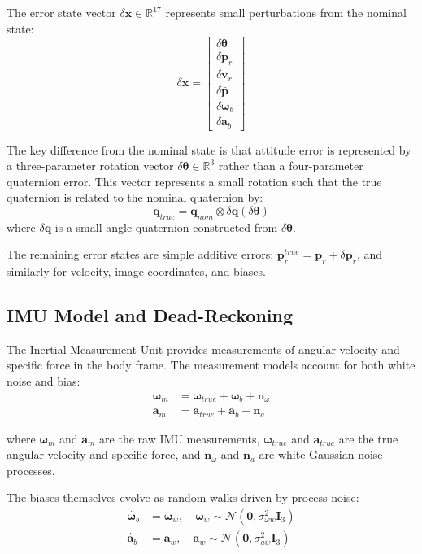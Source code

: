 \documentclass[11pt,a4paper]{article}
\newcommand{\quat}{\mathbf{q}}
\newcommand{\pr}{\mathbf{p}_r}
\newcommand{\vr}{\mathbf{v}_r}
\newcommand{\pbar}{\bar{\mathbf{p}}}
\newcommand{\bgyr}{\bm{\omega}_b}
\newcommand{\bacc}{\mathbf{a}_b}
\newcommand{\I}{\mathbf{I}}
\begin{document}
The error state vector $\delta\mathbf{x} \in \mathbb{R}^{17}$ represents small perturbations from the nominal state:
\begin{equation}
    \delta\mathbf{x} = \begin{bmatrix} \delta\bm{\theta} \\ \delta\pr \\ \delta\vr \\ \delta\pbar \\ \delta\bgyr \\ \delta\bacc \end{bmatrix}
\end{equation}

The key difference from the nominal state is that attitude error is represented by a three-parameter rotation vector $\delta\bm{\theta} \in \mathbb{R}^3$ rather than a four-parameter quaternion error. This vector represents a small rotation such that the true quaternion is related to the nominal quaternion by:
\begin{equation}
    \quat_{true} = \quat_{nom} \otimes \delta\quat(\delta\bm{\theta})
\end{equation}
where $\delta\quat$ is a small-angle quaternion constructed from $\delta\bm{\theta}$.

The remaining error states are simple additive errors: $\pr^{true} = \pr + \delta\pr$, and similarly for velocity, image coordinates, and biases.

\subsection{IMU Model and Dead-Reckoning}

The Inertial Measurement Unit provides measurements of angular velocity and specific force in the body frame. The measurement models account for both white noise and bias:
\begin{align}
    \bm{\omega}_m &= \bm{\omega}_{true} + \bgyr + \mathbf{n}_\omega \\
    \mathbf{a}_m &= \mathbf{a}_{true} + \bacc + \mathbf{n}_a
\end{align}

where $\bm{\omega}_m$ and $\mathbf{a}_m$ are the raw IMU measurements, $\bm{\omega}_{true}$ and $\mathbf{a}_{true}$ are the true angular velocity and specific force, and $\mathbf{n}_\omega$ and $\mathbf{n}_a$ are white Gaussian noise processes.

The biases themselves evolve as random walks driven by process noise:
\begin{align}
    \dot{\bgyr} &= \bm{\omega}_w, \quad \bm{\omega}_w \sim \mathcal{N}(\mathbf{0}, \sigma_{\omega w}^2 \I_3) \\
    \dot{\bacc} &= \mathbf{a}_w, \quad \mathbf{a}_w \sim \mathcal{N}(\mathbf{0}, \sigma_{aw}^2 \I_3)
\end{align}
\end{document}
